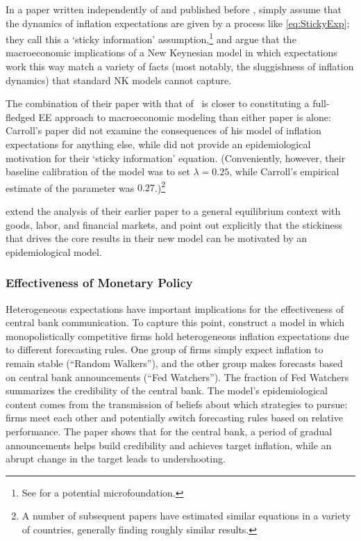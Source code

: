 
In a paper written independently of and published before \cite{carroll2003macroeconomic}, \cite{mr2002Sticky} simply assume that the dynamics of inflation expectations are given by a process like \eqref{eq:StickyExp}; they call this a `sticky information' assumption,\footnote{See \bvbayesianlearningFull for a potential microfoundation.} and argue that the macroeconomic implications of a New Keynesian model in which expectations work this way match a variety of facts (most notably, the sluggishness of inflation dynamics) that standard NK models cannot capture.

The combination of their paper with that of~\cite{carroll2003macroeconomic} is closer to constituting a full-fledged EE approach to macroeconomic modeling than either paper is alone: Carroll's paper did not examine the consequences of his model of inflation expectations for anything else, while \cite{mr2002Sticky} did not provide an epidemiological motivation for their `sticky information' equation.  (Conveniently, however, their baseline calibration of the model was to set $\lambda=0.25$, while Carroll's empirical estimate of the parameter was $0.27$.)\footnote{A number of subsequent papers have estimated similar equations in a variety of countries, generally finding roughly similar results.}


\cite{mankiw2007sticky} extend the analysis of their earlier paper to a general equilibrium context with goods, labor, and financial markets, and point out explicitly that the stickiness that drives the core results in their new model can be motivated by an epidemiological model.

\subsubsection{Effectiveness of Monetary Policy}

Heterogeneous expectations have important implications for the effectiveness of central bank communication.   To capture this point, \cite{hachem_inflation_2017} construct a model in which monopolistically competitive firms hold heterogeneous inflation expectations due to different forecasting rules. One group of firms simply expect inflation to remain stable (``Random Walkers''), and the other group makes forecasts based on central bank announcements (``Fed Watchers''). The fraction of Fed Watchers summarizes the credibility of the central bank.  The model's epidemiological content comes from the transmission of beliefs about which strategies to pursue:  firms meet each other and potentially switch forecasting rules based on relative performance. The paper shows that for the central bank, a period of gradual announcements helps build credibility and achieves target inflation, while an abrupt change in the target leads to undershooting.

